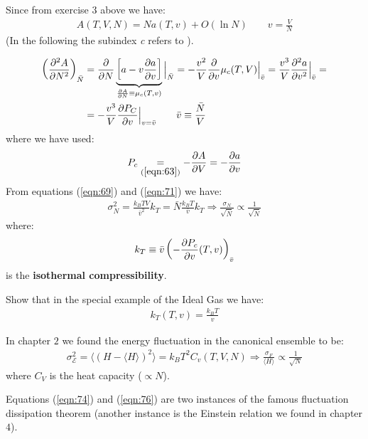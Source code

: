 \documentclass[../../main.tex]{subfiles}
\begin{document}
Since from exercise 3 above we have:
\begin{align}\label{eqn:70}
    A(T,V,N) = N a(T,v) + O(\ln N) \qquad v=\frac{V}{N} 
\end{align}
(In the following the subindex \textit{c} refers to ).

\begin{align}\label{eqn:71}
    \left(\pdv[2]{A}{N}\right)_{\bar{N}} &= \pdv{N} \underbrace{\left[a - v \pdv{a}{v}\right]}_{\pdv{A}{N} \equiv \mu_c (T,v)}\Big|_{\bar{N}} = - \frac{v^2}{V} \pdv{v} \mu_c(T,V)\Big|_{\bar{v}} =\frac{v^3}{V} \pdv[2]{a}{v}\Big|_{\bar{v}} =\\ \nonumber
    &= -\frac{v^3}{V} \pdv{P_C}{v} \Big|_{v = \bar{v}} \qquad \bar{v} \equiv \frac{\bar{N}}{V} 
\end{align}
where we have used:
\begin{align}\label{eqn:72}
    P_c \underset{(\ref{eqn:63})}{=} -\pdv{A}{V} = -\pdv{a}{v}
\end{align}
From equations (\ref{eqn:69}) and (\ref{eqn:71}) we have:
\begin{align} \label{eqn:73}
    \sigma_N^2 = \frac{k_B T V}{\bar{v}^2} k_T = \bar{N} \frac{k_B T}{\bar{v}} k_T \Rightarrow \frac{\sigma_N}{\sqrt{\bar{N}}}    \propto \frac{1}{\sqrt{\bar{N}}} 
\end{align}
where:
\begin{align}\label{eqn:74}
    k_T \equiv \bar{v} \left(-{\pdv{P_c}{v}}(T,v)\right)_{\bar{v}}
\end{align}
is the \textbf{isothermal compressibility}.

\begin{exo}[5]
    Show that in the special example of the Ideal Gas we have:
    \begin{align}\label{eqn:75}
        k_T(T,v) = \frac{k_B T}{v} 
    \end{align}
\end{exo}

In chapter $2$ we found the energy fluctuation in the canonical ensemble to be:
\begin{align}
    \label{eqn:76}
    \sigma_{\mathcal{E}}^2 = \langle (H- \langle H \rangle)^2 \rangle = k_B T^2 C_v(T,V,N) \Rightarrow \frac{\sigma_F}{\langle H \rangle}  \propto \frac{1}{\sqrt{N}} 
\end{align}
where $C_V$ is the heat capacity ($\propto N$).

Equations (\ref{eqn:74}) and (\ref{eqn:76}) are two instances of the famous fluctuation dissipation theorem (another instance is the Einstein relation we found in chapter $4$).
\end{document}
